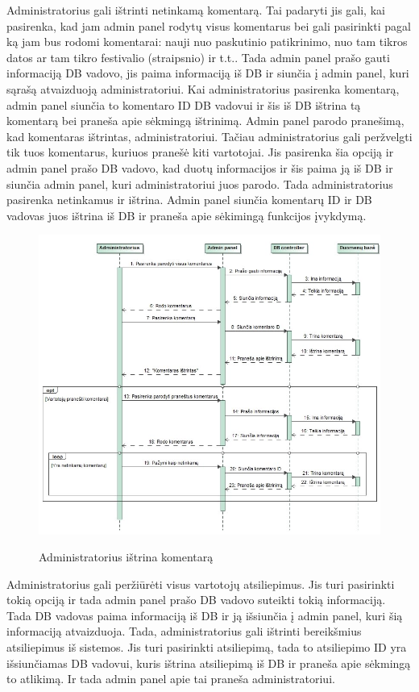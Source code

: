 ﻿\documentclass{VUMIFPSkursinis}
\begin{document}
Administratorius gali ištrinti netinkamą komentarą. Tai padaryti jis gali, kai pasirenka, kad jam admin panel rodytų visus komentarus bei gali pasirinkti pagal ką jam bus rodomi komentarai: nauji nuo paskutinio patikrinimo, nuo tam tikros datos ar tam tikro festivalio (straipsnio) ir t.t.. Tada admin panel prašo gauti informaciją DB vadovo, jis paima informaciją iš DB ir siunčia į admin panel, kuri sąrašą atvaizduoją administratoriui. Kai administratorius pasirenka komentarą, admin panel siunčia to komentaro ID DB vadovui ir šis iš DB ištrina tą komentarą bei praneša apie sėkmingą ištrinimą. Admin panel parodo pranešimą, kad komentaras ištrintas, administratoriui. 
	Tačiau administratorius gali peržvelgti tik tuos komentarus, kuriuos pranešė kiti vartotojai. Jis pasirenka šia opciją ir admin panel prašo DB vadovo, kad duotų informacijos ir šis paima ją iš DB ir siunčia admin panel, kuri administratoriui juos parodo. Tada administratorius pasirenka netinkamus ir ištrina. Admin panel siunčia komentarų ID ir DB vadovas juos ištrina iš DB ir praneša apie sėkimingą funkcijos įvykdymą.

\begin{figure}[H]
    \centering
    \includegraphics[scale=0.5]{img/Pav/AdminIstrintiKomentarus}
    \label{img:uml14}
	\caption{Administratorius ištrina komentarą}
\end{figure}	
	
Administratorius gali peržiūrėti visus vartotojų atsiliepimus. Jis turi pasirinkti tokią opciją ir tada admin panel prašo DB vadovo suteikti tokią informaciją. Tada DB vadovas paima informaciją iš DB ir ją išsiunčia į admin panel, kuri šią informaciją atvaizduoja. Tada, administratorius gali ištrinti bereikšmius atsiliepimus iš sistemos. Jis turi pasirinkti atsiliepimą, tada to atsiliepimo ID yra išsiunčiamas DB vadovui, kuris ištrina atsiliepimą iš DB ir praneša apie sėkmingą to atlikimą. Ir tada admin panel apie tai praneša administratoriui.
	
\end{document}
